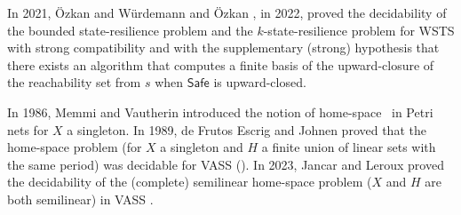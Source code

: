\documentclass[runningheads]{llncs}
\newcommand{\post}{\textsf{post}}
\newcommand{\Bad}{\textsf{Bad}}
\newcommand{\Safe}{\textsf{Safe}}
\begin{document}

In 2021, \"Ozkan and Würdemann  \cite{DBLP:journals/corr/abs-2108-00889} and \"Ozkan \cite{DBLP:conf/gg/Ozkan22}, in 2022, proved the decidability of the bounded state-resilience problem and the $k$-state-resilience problem for WSTS  with strong compatibility and with the supplementary (strong) hypothesis that there exists an algorithm that computes a finite basis of the upward-closure of the reachability set from $s$ 
%
%
when $\Safe$ is upward-closed.
%

In 1986, Memmi and Vautherin introduced the notion of home-space~\cite{DBLP:conf/ac/MemmiV86} in Petri nets for $X$ a singleton. In 1989, de Frutos Escrig and Johnen proved that the home-space problem (for $X$ a singleton and $H$ a finite union of linear sets with the same period) was decidable for VASS (\cite{de1989decidability}). In 2023, Jancar and Leroux proved the decidability of the (complete) semilinear home-space problem ($X$ and $H$ are both semilinear)  in VASS \cite{DBLP:journals/corr/abs-2207-02697}.
\end{document}
